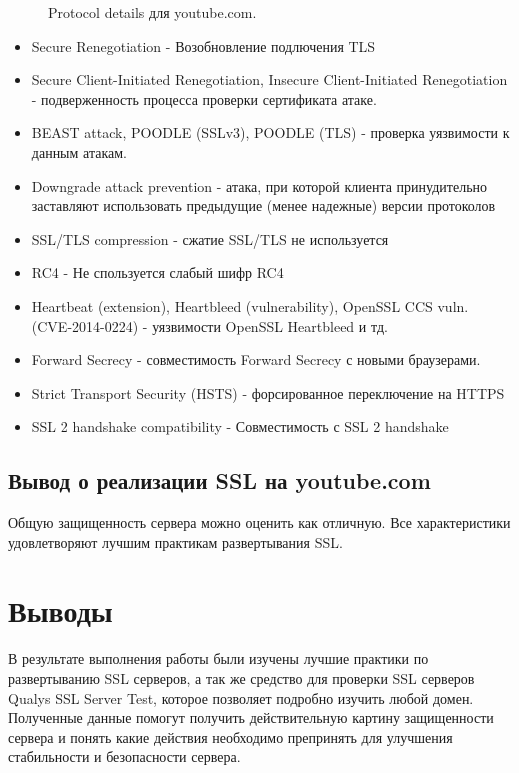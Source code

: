 \documentclass[10pt,a4paper]{report}
\begin{document}
\begin{figure}[h!]	
	\caption{Protocol details для youtube.com.}
	\label{Img:5}
\end{figure}

\begin{itemize}
	\item{Secure Renegotiation - Возобновление подлючения TLS}
	\item{Secure Client-Initiated Renegotiation, Insecure Client-Initiated Renegotiation - подверженность процесса проверки сертификата атаке.}
	\item{BEAST attack, POODLE (SSLv3), POODLE (TLS) - проверка уязвимости к данным атакам.}
	\item{Downgrade attack prevention - атака, при которой клиента принудительно заставляют использовать предыдущие (менее надежные) версии протоколов}
	\item{SSL/TLS compression - сжатие SSL/TLS не используется}
	\item{RC4 - Не спользуется слабый шифр RC4}
	\item{Heartbeat (extension), Heartbleed (vulnerability), OpenSSL CCS vuln. (CVE-2014-0224) - уязвимости OpenSSL Heartbleed и тд.}
	\item{Forward Secrecy - совместимость Forward Secrecy с новыми браузерами.}
	\item{Strict Transport Security (HSTS) - форсированное переключение на HTTPS}
	\item{SSL 2 handshake compatibility - Совместимость с SSL 2 handshake}
\end{itemize}

\subsection{Вывод о реализации SSL на youtube.com}

Общую защищенность сервера можно оценить как отличную. Все характеристики удовлетворяют лучшим практикам развертывания SSL.

\section{Выводы}
В результате выполнения работы были изучены лучшие практики по развертыванию SSL серверов, а так же средство для проверки SSL серверов Qualys SSL Server Test, которое позволяет подробно изучить любой домен. Полученные данные помогут получить действительную картину защищенности сервера и понять какие действия необходимо препринять для улучшения стабильности и безопасности сервера.
\end{document}
